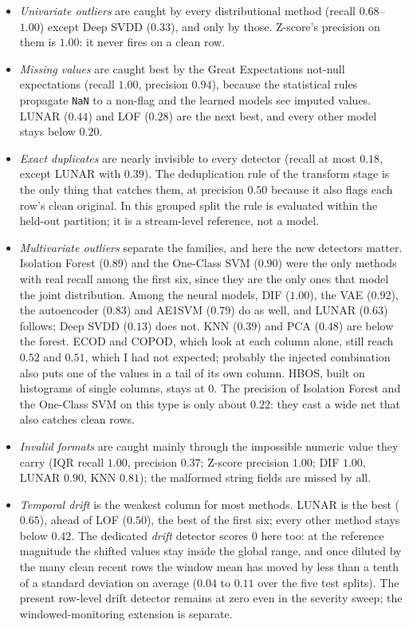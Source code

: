 \documentclass[conference]{IEEEtran}
\begin{document}
\begin{itemize}
    \item \emph{Univariate outliers} are caught by every distributional
    method (recall $0.68$--$1.00$) except Deep SVDD ($0.33$), and only by those. Z-score's precision
    on them is $1.00$: it never fires on a clean row.
    \item \emph{Missing values} are caught best by the Great Expectations
    not-null expectations (recall $1.00$, precision $0.94$), because the
    statistical rules propagate \texttt{NaN} to a non-flag and the learned
    models see imputed values. LUNAR ($0.44$) and LOF ($0.28$) are the next best,
    and every other model stays below $0.20$.
    \item \emph{Exact duplicates} are nearly invisible to every detector
    (recall at most $0.18$, except LUNAR with $0.39$). The
    deduplication rule of the transform stage is the only thing that
    catches them, at precision $0.50$ because it also flags each row's
    clean original. In this grouped split the rule is evaluated within
    the held-out partition; it is a stream-level reference, not a model.
    \item \emph{Multivariate outliers} separate the families, and here the new detectors
    matter. Isolation Forest ($0.89$) and the One-Class SVM ($0.90$) were the only
    methods with real recall among the first six, since they are the only ones that
    model the joint distribution. Among the neural models, DIF ($1.00$), the VAE
    ($0.92$), the autoencoder ($0.83$) and AE1SVM ($0.79$) do as well, and LUNAR ($0.63$)
    follows; Deep SVDD ($0.13$) does not. KNN ($0.39$) and PCA ($0.48$) are below the
    forest. ECOD and COPOD, which look at each column alone, still reach $0.52$ and
    $0.51$, which I had not expected; probably the injected combination also puts one of the
    values in a tail of its own column. HBOS, built on histograms of single columns,
    stays at $0$. The precision of Isolation Forest and the One-Class SVM on this
    type is only about $0.22$: they cast a wide net that also catches clean rows.
    \item \emph{Invalid formats} are caught mainly through the impossible
    numeric value they carry (IQR recall $1.00$, precision $0.37$; Z-score
    precision $1.00$; DIF $1.00$, LUNAR $0.90$, KNN $0.81$); the malformed string fields
    are missed by all.
    \item \emph{Temporal drift} is the weakest column for most methods. LUNAR is the best
    ($0.65$), ahead of LOF ($0.50$), the best of the first six; every other method stays
    below $0.42$. The dedicated \emph{drift} detector scores
    $0$ here too: at the reference magnitude the shifted values stay
    inside the global range, and once diluted by the many clean recent
    rows the window mean has moved by less than a tenth of a standard
    deviation on average ($0.04$ to $0.11$ over the five test splits). The
    present row-level drift detector remains at zero even in the severity
    sweep; the windowed-monitoring extension is separate.
\end{itemize}
\end{document}
